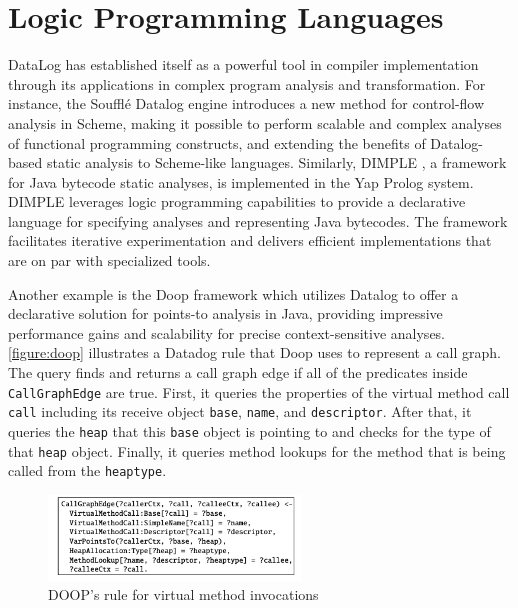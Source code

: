 \section{Logic Programming Languages}
DataLog has established itself as a powerful tool in compiler implementation through its applications in complex program analysis and transformation. 
For instance, the Soufflé Datalog engine \cite{silverman2021wantanalyzeschemeprograms} introduces a new method for control-flow analysis in Scheme, making it possible to perform scalable and complex analyses of functional programming constructs, and extending the benefits of Datalog-based static analysis to Scheme-like languages. Similarly, DIMPLE \cite{Benton2007}, a framework for Java bytecode static analyses, is implemented in the Yap Prolog system. DIMPLE leverages logic programming capabilities to provide a declarative language for specifying analyses and representing Java bytecodes. The framework facilitates iterative experimentation and delivers efficient implementations that are on par with specialized tools. 

Another example is the Doop framework \cite{Bravenboer2009} which utilizes Datalog to offer a declarative solution for points-to analysis in Java, providing impressive performance gains and scalability for precise context-sensitive analyses. \autoref{figure:doop} illustrates a Datadog rule that Doop uses to represent a call graph. The query finds and returns a call graph edge if all of the predicates inside \texttt{CallGraphEdge} are true. First, it queries the properties of the virtual method call \texttt{call} including its receive object \texttt{base}, \texttt{name}, and \texttt{descriptor}. After that, it queries the \texttt{heap} that this \texttt{base} object is pointing to and checks for the type of that \texttt{heap} object. Finally, it queries method lookups for the method that is being called from the \texttt{heaptype}.

\begin{figure}[h]
    \centering
    \includegraphics[width=0.6\textwidth]{Packages/Doop.png}
    \caption{DOOP's rule for virtual method invocations \cite{Bravenboer2009}}
    \label{figure:doop}
\end{figure}

